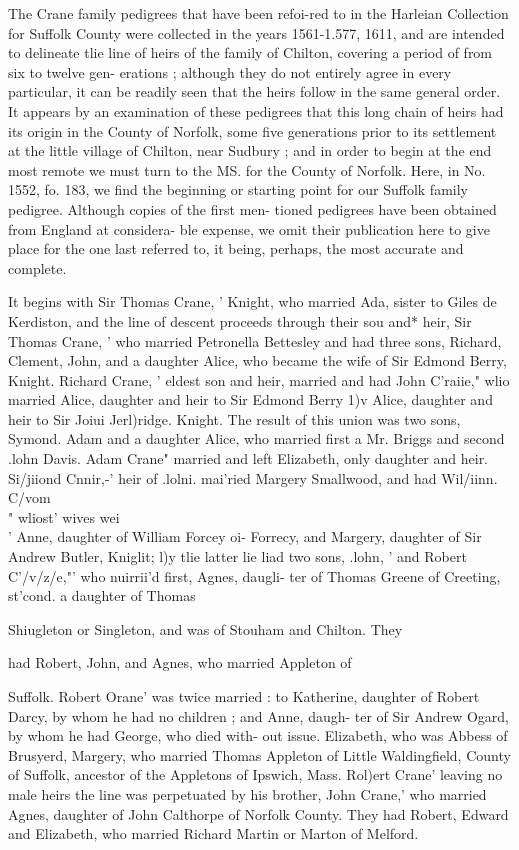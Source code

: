 \documentclass{book}
\begin{document}
The Crane family pedigrees that have been refoi-red to in the 
Harleian Collection for Suffolk County were collected in the years 
1561-1.577, 1611, and are intended to delineate tlie line of heirs of 
the family of Chilton, covering a period of from six to twelve gen- 
erations ; although they do not entirely agree in every particular, 
it can be readily seen that the heirs follow in the same general 
order. It appears by an examination of these pedigrees that this 
long chain of heirs had its origin in the County of Norfolk, some 
five generations prior to its settlement at the little village of 
Chilton, near Sudbury ; and in order to begin at the end most 
remote we must turn to the MS. for the County of Norfolk. 
Here, in No. 1552, fo. 183, we find the beginning or starting point 
for our Suffolk family pedigree. Although copies of the first men- 
tioned pedigrees have been obtained from England at considera- 
ble expense, we omit their publication here to give place for the 
one last referred to, it being, perhaps, the most accurate and 
complete. 

It begins with Sir Thomas Crane, ' Knight, who married Ada, 
sister to Giles de Kerdiston, and the line of descent proceeds 
through their sou and* heir, Sir Thomas Crane, ' who married 
Petronella Bettesley and had three sons, Richard, Clement, John, 
and a daughter Alice, who became the wife of Sir Edmond Berry, 
Knight. Richard Crane, ' eldest son and heir, married and had 
John C'raiie," wlio married Alice, daughter and heir to Sir 
Edmond Berry 1)v Alice, daughter and heir to Sir Joiui Jerl)ridge. 
Knight. The result of this union was two sons, Symond. Adam 
and a daughter Alice, who married first a Mr. Briggs and second 
.lohn Davis. Adam Crane" married and left Elizabeth, only 
daughter and heir. Si/jiiond Cnnir,-' heir of .lolni. mai'ried 
Margery Smallwood, and had Wil/iinn. C/vom\\" wliost' wives wei\\' 
Anne, daughter of William Forcey oi- Forrecy, and Margery, 
daughter of Sir Andrew Butler, Kniglit; l)y tlie latter lie liad two 
sons, .lohn, ' and Robert C'/v/z/e,"' who nuirrii'd first, Agnes, daugli- 
ter of Thomas Greene of Creeting, st'cond. a daughter of Thomas 




Shiugleton or Singleton, and was of Stouham and Chilton. They 

had Robert, John, and Agnes, who married Appleton of 

Suffolk. Robert Orane' was twice married : to Katherine, daughter 
of Robert Darcy, by whom he had no children ; and Anne, daugh- 
ter of Sir Andrew Ogard, by whom he had George, who died with- 
out issue. Elizabeth, who was Abbess of Brusyerd, Margery, 
who married Thomas Appleton of Little Waldingfield, County of 
Suffolk, ancestor of the Appletons of Ipswich, Mass. Rol)ert 
Crane' leaving no male heirs the line was perpetuated by his 
brother, John Crane,' who married Agnes, daughter of John 
Calthorpe of Norfolk County. They had Robert, Edward and 
Elizabeth, who married Richard Martin or Marton of Melford. 
\end{document}
